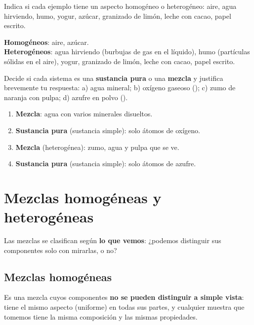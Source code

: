 \begin{exercise}
    Indica si cada ejemplo tiene un aspecto homogéneo o heterogéneo: aire, agua hirviendo, humo, yogur, azúcar, granizado de limón, leche con cacao, papel escrito.
    \begin{solu}
        \textbf{Homogéneos}: aire, azúcar. \\
        \textbf{Heterogéneos}: agua hirviendo (burbujas de gas en el líquido), humo (partículas sólidas en el aire), yogur, granizado de limón, leche con cacao, papel escrito.
    \end{solu}
\end{exercise}

\begin{exercise}
    Decide si cada sistema es una \textbf{sustancia pura} o una \textbf{mezcla} y justifica brevemente tu respuesta: a) agua mineral; b) oxígeno gaseoso (); c) zumo de naranja con pulpa; d) azufre en polvo ().
    \begin{solu}
        \begin{enumerate}[label=\alph*)]
            \item \textbf{Mezcla}: agua con varios minerales disueltos.
            \item \textbf{Sustancia pura} (sustancia simple): solo átomos de oxígeno.
            \item \textbf{Mezcla} (heterogénea): zumo, agua y pulpa que se ve.
            \item \textbf{Sustancia pura} (sustancia simple): solo átomos de azufre.
        \end{enumerate}
    \end{solu}
\end{exercise}


\section{Mezclas homogéneas y heterogéneas}

Las mezclas se clasifican según \textbf{lo que vemos}: ¿podemos distinguir sus componentes solo con mirarlas, o no?

\subsection{Mezclas homogéneas}

\begin{definition}
    Es una mezcla cuyos componentes \textbf{no se pueden distinguir a simple vista}: tiene el mismo aspecto (uniforme) en todas sus partes, y cualquier muestra que tomemos tiene la misma composición y las mismas propiedades.
\end{definition}

